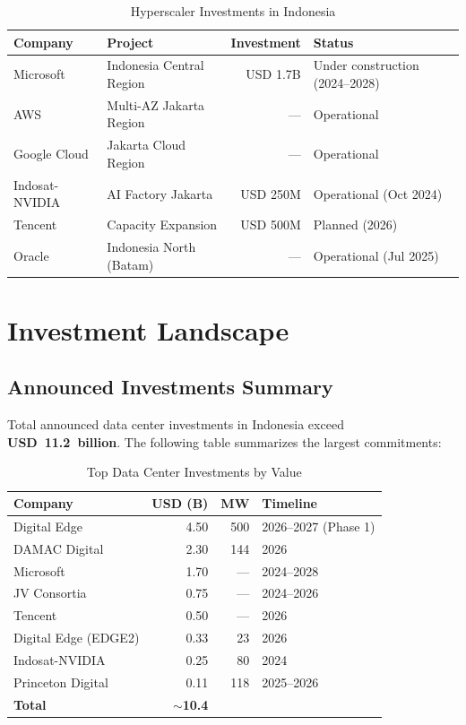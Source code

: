 \documentclass[11pt,a4paper]{article}
\begin{document}
\begin{table}[H]
\centering
\caption{Hyperscaler Investments in Indonesia}
\begin{tabular}{p{3cm}p{4cm}rp{4cm}}
\toprule
\textbf{Company} & \textbf{Project} & \textbf{Investment} & \textbf{Status} \\
\midrule
Microsoft     & Indonesia Central Region   & USD 1.7B & Under construction (2024--2028) \\
AWS           & Multi-AZ Jakarta Region    & ---      & Operational \\
Google Cloud  & Jakarta Cloud Region       & ---      & Operational \\
Indosat-NVIDIA& AI Factory Jakarta         & USD 250M & Operational (Oct 2024) \\
Tencent       & Capacity Expansion         & USD 500M & Planned (2026) \\
Oracle        & Indonesia North (Batam)    & ---      & Operational (Jul 2025) \\
\bottomrule
\end{tabular}
\end{table}

\section{Investment Landscape}

\subsection{Announced Investments Summary}

Total announced data center investments in Indonesia exceed \textbf{USD~11.2~billion}. The following table summarizes the largest commitments:

\begin{table}[H]
\centering
\caption{Top Data Center Investments by Value}
\begin{tabular}{p{3.5cm}rrp{4cm}}
\toprule
\textbf{Company} & \textbf{USD (B)} & \textbf{MW} & \textbf{Timeline} \\
\midrule
Digital Edge       & 4.50 & 500  & 2026--2027 (Phase 1) \\
DAMAC Digital      & 2.30 & 144  & 2026 \\
Microsoft          & 1.70 & ---  & 2024--2028 \\
JV Consortia       & 0.75 & ---  & 2024--2026 \\
Tencent            & 0.50 & ---  & 2026 \\
Digital Edge (EDGE2)& 0.33 & 23  & 2026 \\
Indosat-NVIDIA     & 0.25 & 80   & 2024 \\
Princeton Digital  & 0.11 & 118  & 2025--2026 \\
\midrule
\textbf{Total}     & \textbf{$\sim$10.4} & & \\
\bottomrule
\end{tabular}
\end{table}
\end{document}
